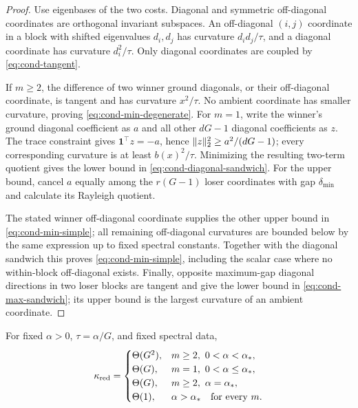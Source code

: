 \begin{proof}
Use eigenbases of the two costs.  Diagonal and symmetric off-diagonal
coordinates are orthogonal invariant subspaces.  An off-diagonal $(i,j)$
coordinate in a block with shifted eigenvalues $d_i,d_j$ has curvature
$d_id_j/\tau$, and a diagonal coordinate has curvature $d_i^2/\tau$.
Only diagonal coordinates are coupled by \eqref{eq:cond-tangent}.

If $m\ge2$, the difference of two winner ground diagonals, or their
off-diagonal coordinate, is tangent and has curvature $x^2/\tau$.  No
ambient coordinate has smaller curvature, proving \eqref{eq:cond-min-degenerate}.
For $m=1$, write the winner's ground diagonal coefficient as $a$ and all other
$dG-1$ diagonal coefficients as $z$.  The trace constraint gives
$\mathbf1^\top z=-a$, hence $\lVert z\rVert_2^2\ge a^2/(dG-1)$; every corresponding
curvature is at least $b(x)^2/\tau$.  Minimizing the resulting two-term quotient
gives the lower bound in \eqref{eq:cond-diagonal-sandwich}.  For the upper
bound, cancel $a$ equally among the $r(G-1)$ loser coordinates with gap
$\delta_{\min}$ and calculate its Rayleigh quotient.

The stated winner off-diagonal coordinate supplies the other upper bound in
\eqref{eq:cond-min-simple}; all remaining off-diagonal curvatures are bounded
below by the same expression up to fixed spectral constants.  Together with
the diagonal sandwich this proves \eqref{eq:cond-min-simple}, including the
scalar case where no within-block off-diagonal exists.  Finally, opposite
maximum-gap diagonal directions in two loser blocks are tangent and give the
lower bound in \eqref{eq:cond-max-sandwich}; its upper bound is the largest
curvature of an ambient coordinate.
\end{proof}

\begin{theorem}
\label{thm:cond-conditioning-phases}
For fixed $\alpha>0$, $\tau=\alpha/G$, and fixed spectral data,
\begin{equation}
 \kappa_{\rm red}=\begin{cases}
 \Theta(G^2),&m\ge2,\ 0<\alpha<\alpha_*,\\
 \Theta(G),&m=1,\ 0<\alpha\le\alpha_*,\\
 \Theta(G),&m\ge2,\ \alpha=\alpha_*,\\
 \Theta(1),&\alpha>\alpha_*\quad\text{for every }m.
 \end{cases}
 \label{eq:cond-kappa-phases}
\end{equation}
\end{theorem}

